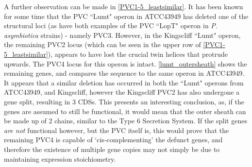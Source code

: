 A further observation can be made in \vref{PVC1-5_leastsimilar}. It has been known for some time that the PVC ``Lumt" operon in \Pasy{} ATCC43949 has deleted one of the structural loci (as have both examples of the PVC ``LopT" operon in \emph{P. asymbiotica} strains) - namely PVC3. However, in the Kingscliff ``Lumt" operon, the remaining PVC2 locus (which can be seen in the upper row of \vref{PVC1-5_leastsimilar}), appears to have lost the crucial twin helices that protrude upwards. The PVC4 locus for this operon is intact. \vref{lumt_outersheath} shows the remaining genes, and compares the sequence to the same operon in \Pasy{} ATCC43949. It appears that a similar deletion has occurred in both the ``Lumt" operons from \Pasy{} ATCC43949, and Kingscliff, however the Kingscliff PVC2 has also undergone a gene split, resulting in 3 CDSs. This presents an interesting conclusion, as, if the genes are assumed to still be functional, it would mean that the outer sheath can be made up of 2 chains, similar to the Type 6 Secretion System. If the split genes \emph{are not} functional however, but the PVC itself is, this would prove that the remaining PVC4 is capable of `cis-complementing' the defunct genes, and therefore the existence of multiple gene copies may not simply be due to maintaining expression stoichiometry.


